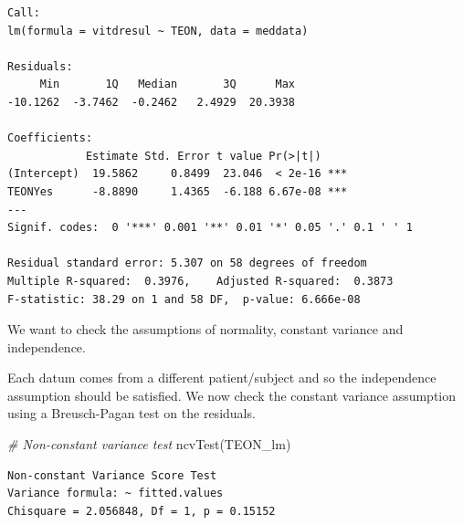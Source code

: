 \documentclass[
  oneside]{krantz}
\newenvironment{Shaded}{\begin{snugshade}}{\end{snugshade}}
\newcommand{\AttributeTok}[1]{\textcolor[rgb]{0.77,0.63,0.00}{#1}}
\newcommand{\CommentTok}[1]{\textcolor[rgb]{0.56,0.35,0.01}{\textit{#1}}}
\newcommand{\FunctionTok}[1]{\textcolor[rgb]{0.00,0.00,0.00}{#1}}
\newcommand{\NormalTok}[1]{#1}
\newcommand{\OtherTok}[1]{\textcolor[rgb]{0.56,0.35,0.01}{#1}}
\newcommand{\SpecialCharTok}[1]{\textcolor[rgb]{0.00,0.00,0.00}{#1}}
\newcommand{\StringTok}[1]{\textcolor[rgb]{0.31,0.60,0.02}{#1}}
\begin{document}
\begin{Shaded}
\end{Shaded}

\begin{verbatim}
Call:
lm(formula = vitdresul ~ TEON, data = meddata)

Residuals:
     Min       1Q   Median       3Q      Max 
-10.1262  -3.7462  -0.2462   2.4929  20.3938 

Coefficients:
            Estimate Std. Error t value Pr(>|t|)    
(Intercept)  19.5862     0.8499  23.046  < 2e-16 ***
TEONYes      -8.8890     1.4365  -6.188 6.67e-08 ***
---
Signif. codes:  0 '***' 0.001 '**' 0.01 '*' 0.05 '.' 0.1 ' ' 1

Residual standard error: 5.307 on 58 degrees of freedom
Multiple R-squared:  0.3976,    Adjusted R-squared:  0.3873 
F-statistic: 38.29 on 1 and 58 DF,  p-value: 6.666e-08
\end{verbatim}

We want to check the assumptions of normality, constant variance and independence.

Each datum comes from a different patient/subject and so the independence assumption should be satisfied. We now check the constant variance assumption using a Breusch-Pagan test on the residuals.

\begin{Shaded}
\begin{Highlighting}[]
\CommentTok{\# Non{-}constant variance test}
\FunctionTok{ncvTest}\NormalTok{(TEON\_lm)}
\end{Highlighting}
\end{Shaded}

\begin{verbatim}
Non-constant Variance Score Test 
Variance formula: ~ fitted.values 
Chisquare = 2.056848, Df = 1, p = 0.15152
\end{verbatim}
\end{document}

